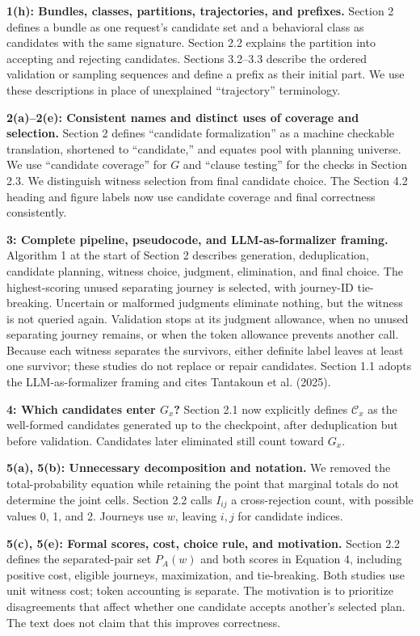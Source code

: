 \documentclass[11pt,a4paper]{scrartcl}
\begin{document}
\textbf{1(h): Bundles, classes, partitions, trajectories, and prefixes.}
Section 2 defines a bundle as one request's candidate set and a behavioral class as candidates with the same signature. Section 2.2 explains the partition into accepting and rejecting candidates. Sections 3.2--3.3 describe the ordered validation or sampling sequences and define a prefix as their initial part. We use these descriptions in place of unexplained ``trajectory'' terminology.

\textbf{2(a)--2(e): Consistent names and distinct uses of coverage and selection.}
Section 2 defines ``candidate formalization'' as a machine checkable translation, shortened to ``candidate,'' and equates pool with planning universe. We use ``candidate coverage'' for $G$ and ``clause testing'' for the checks in Section 2.3. We distinguish witness selection from final candidate choice. The Section 4.2 heading and figure labels now use candidate coverage and final correctness consistently.

\textbf{3: Complete pipeline, pseudocode, and LLM-as-formalizer framing.}
Algorithm 1 at the start of Section 2 describes generation, deduplication, candidate planning, witness choice, judgment, elimination, and final choice. The highest-scoring unused separating journey is selected, with journey-ID tie-breaking. Uncertain or malformed judgments eliminate nothing, but the witness is not queried again. Validation stops at its judgment allowance, when no unused separating journey remains, or when the token allowance prevents another call. Because each witness separates the survivors, either definite label leaves at least one survivor; these studies do not replace or repair candidates. Section 1.1 adopts the LLM-as-formalizer framing and cites Tantakoun et al. (2025).

\newpage
\textbf{4: Which candidates enter $G_x$?}
Section 2.1 now explicitly defines $\mathcal C_x$ as the well-formed candidates generated up to the checkpoint, after deduplication but before validation. Candidates later eliminated still count toward $G_x$.

\textbf{5(a), 5(b): Unnecessary decomposition and notation.}
We removed the total-probability equation while retaining the point that marginal totals do not determine the joint cells. Section 2.2 calls $I_{ij}$ a cross-rejection count, with possible values 0, 1, and 2. Journeys use $w$, leaving $i,j$ for candidate indices.

\textbf{5(c), 5(e): Formal scores, cost, choice rule, and motivation.}
Section 2.2 defines the separated-pair set $P_A(w)$ and both scores in Equation 4, including positive cost, eligible journeys, maximization, and tie-breaking. Both studies use unit witness cost; token accounting is separate. The motivation is to prioritize disagreements that affect whether one candidate accepts another's selected plan. The text does not claim that this improves correctness.
\end{document}
